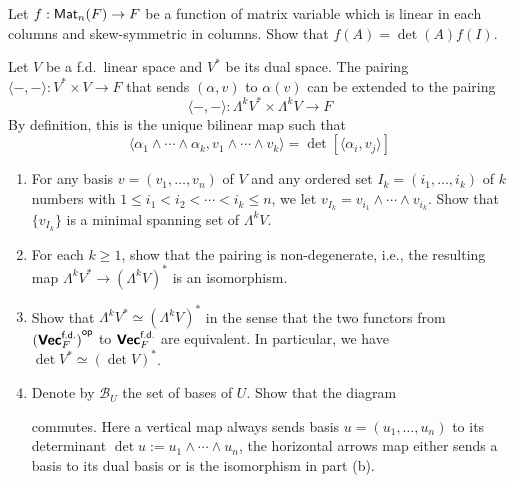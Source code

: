 \begin{problem}
Let $f: \operatorname{\text{\normalfont\sffamily Mat}}_n(F) \to F$ be a function of matrix variable which is linear in each columns and skew-symmetric in columns. Show that $f(A) = \det(A) f(I)$.
\end{problem}

\begin{problem}
Let $V$ be a f.d.\ linear space and $V^*$ be its dual space. The pairing $\langle -, - \rangle: V^* \times V \to F$ that sends $(\alpha, v)$ to $\alpha(v)$ can be extended to the pairing
\[
  \langle -, - \rangle : \Lambda^k V^* \times \Lambda^k V \to F
\]
By definition, this is the unique bilinear map such that
\[
  \langle \alpha_1 \wedge \cdots \wedge \alpha_k, v_1 \wedge \cdots \wedge v_k \rangle = \det [\langle \alpha_i, v_j \rangle]
\]
\begin{enumerate}
  \item For any basis $v = (v_1, \ldots, v_n)$ of $V$ and any ordered set $I_k = (i_1, \ldots, i_k)$ of $k$ numbers with $1 \leq i_1 < i_2 < \cdots < i_k \leq n$, we let $v_{I_k} = v_{i_1} \wedge \cdots \wedge v_{i_k}$. Show that $\{ v_{I_k} \}$ is a minimal spanning set of $\Lambda^k V$.
  \item For each $k \geq 1$, show that the pairing is non-degenerate, i.e., the resulting map $\Lambda^k V^* \to {(\Lambda^k V)}^*$ is an isomorphism.
  \item Show that $\Lambda^k V^* \simeq {(\Lambda^k V)}^*$ in the sense that the two functors from ${(\operatorname{\text{\normalfont\bf\sffamily Vec}}_F^{\operatorname{\text{\normalfont\sffamily f.d.}}})}^{\text{\normalfont\sffamily op}}$ to $\operatorname{\text{\normalfont\bf\sffamily Vec}}_F^{\operatorname{\text{\normalfont\sffamily f.d.}}}$ are equivalent. In particular, we have $\det V^* \simeq {(\det V)}^*$.
  \item Denote by $\mathcal{B}_U$ the set of bases of $U$. Show that the diagram
        \begin{center}
        \end{center}
        commutes. Here a vertical map always sends basis $u = (u_1, \ldots, u_n)$ to its determinant $\det u := u_1 \wedge \cdots \wedge u_n$, the horizontal arrows map either sends a basis to its dual basis or is the isomorphism in part (b).
\end{enumerate}
\end{problem}

